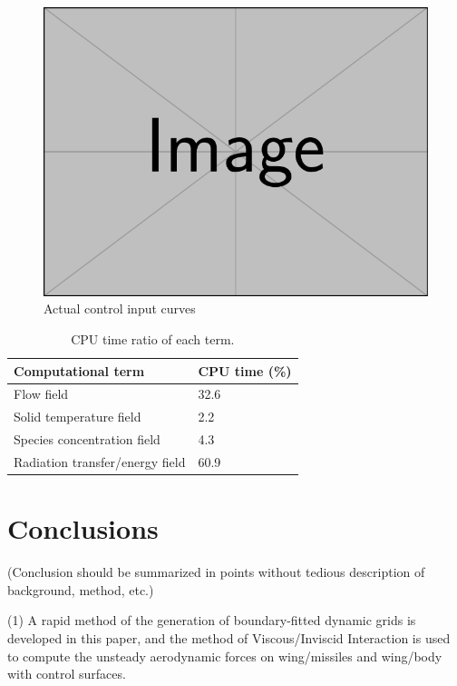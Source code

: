 \documentclass{cja}
\begin{document}
\begin{figure}
  \centering
  \includegraphics[width=0.9\linewidth]{example-image.pdf}
  \caption{Actual control input curves}
\end{figure}

\begin{table}
  \centering
  \caption{CPU time ratio of each term.}
  \begin{tabularx}{\linewidth}{Xl}
    \toprule
    Computational term              & CPU time (\%) \\
    \midrule
    Flow field                      & 32.6          \\
    Solid temperature field         & 2.2           \\
    Species concentration field     & 4.3           \\
    Radiation transfer/energy field & 60.9          \\
    \bottomrule
  \end{tabularx}
\end{table}



\section{Conclusions}
\label{sec:conclusions}

\begin{instructions}
  (Conclusion should be summarized in points without tedious description of background, method, etc.)
\end{instructions}

(1) A rapid method of the generation of boundary-fitted dynamic grids is developed in this paper, and the method of Viscous/Inviscid Interaction is used to compute the unsteady aerodynamic forces on wing/missiles and wing/body with control surfaces.
\end{document}
